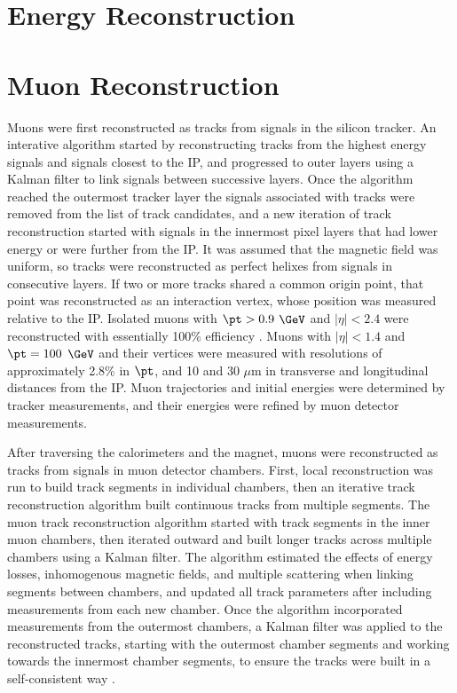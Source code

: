 \section{Energy Reconstruction}
\label{sec:enrgReco}



\section{Muon Reconstruction}
\label{sec:muReco}

Muons were first reconstructed as tracks from signals in the silicon tracker.  An interative algorithm started 
by reconstructing tracks from the highest energy signals and signals closest to the IP, and progressed to outer layers 
using a Kalman filter to link signals between successive layers.  Once the algorithm reached the outermost tracker 
layer the signals associated with tracks were removed from the list of track candidates, and a new iteration of track 
reconstruction started with signals in the innermost pixel layers that had lower energy or were further 
from the IP.  It was assumed that the magnetic field was uniform, so tracks were reconstructed as perfect helixes 
from signals in consecutive layers.  If two or more tracks shared a common origin point, that point was reconstructed 
as an interaction vertex, whose position was measured relative to the IP.  Isolated muons with 
$\pt > 0.9$ $\GeV$ and $|\eta| < 2.4$ were reconstructed with essentially 100\% efficiency \cite{trackerPerformanceInCollisions}.  
Muons with $|\eta| < 1.4$ and $\pt = 100$ $\GeV$ and their vertices were measured with resolutions of approximately 
2.8\% in $\pt$, and 10 and 30 $\mu$m in transverse and longitudinal distances from the IP.  Muon trajectories and 
initial energies were determined by tracker measurements, and their energies were refined by muon detector measurements.

After traversing the calorimeters and the magnet, muons were reconstructed as tracks from signals in muon detector chambers.  
First, local reconstruction was run to build track segments in individual chambers, then an iterative track 
reconstruction algorithm built continuous tracks from multiple segments.  The muon track reconstruction algorithm started 
with track segments in the inner muon chambers, then iterated outward and built longer tracks across multiple chambers 
using a Kalman filter.  The algorithm estimated the effects of energy losses, inhomogenous magnetic fields, and multiple 
scattering when linking segments between chambers, and updated all track parameters after including measurements 
from each new chamber.  Once the algorithm incorporated measurements from the outermost chambers, a Kalman filter 
was applied to the reconstructed tracks, starting with the outermost chamber segments and working towards the 
innermost chamber segments, to ensure the tracks were built in a self-consistent way \cite{muonRecoFirstCollisions}.  

